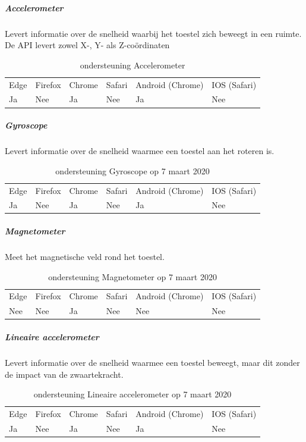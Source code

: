 	
	\subparagraph{Accelerometer  }
		Levert informatie over de snelheid waarbij het toestel zich beweegt in een ruimte. De API levert zowel X-, Y- als Z-coördinaten
		
		\begin{table}[H]
			\centering
			\begin{tabular}{llllll}
				Edge & Firefox & Chrome & Safari & Android (Chrome) & IOS (Safari) \\
				Ja   & Nee      &  Ja   & Nee     & Ja               & Nee          
			\end{tabular}	
			\caption{ondersteuning	Accelerometer   }
		\end{table}
		
		
		
	\subparagraph{Gyroscope  }
		Levert informatie over de snelheid waarmee een toestel aan het roteren is. 
			
		\begin{table}[H]
			\centering
			\begin{tabular}{llllll}
				Edge & Firefox & Chrome & Safari & Android (Chrome) & IOS (Safari) \\
				Ja   & Nee      &  Ja   & Nee     & Ja               & Nee          
			\end{tabular}	
			\caption{ondersteuning Gyroscope op 7 maart 2020 }
		\end{table}
			
	\subparagraph{Magnetometer }
			Meet het magnetische veld rond het toestel. 
			
		\begin{table}[H]
			\centering
			\begin{tabular}{llllll}
				Edge & Firefox & Chrome & Safari & Android (Chrome) & IOS (Safari) \\
				Nee   & Nee      &  Ja   & Nee     & Nee               & Nee          
			\end{tabular}	
			\caption{ondersteuning Magnetometer op 7 maart 2020 }
		\end{table}
			
			
	\subparagraph{Lineaire accelerometer}
		Levert informatie over de snelheid waarmee een toestel beweegt, maar dit zonder de impact van de zwaartekracht.
			
		\begin{table}[H]
			\centering
			\begin{tabular}{llllll}
				Edge & Firefox & Chrome & Safari & Android (Chrome) & IOS (Safari) \\
				Ja   & Nee      &  Ja   & Nee     & Ja               & Nee          
			\end{tabular}	
			\caption{ondersteuning Lineaire accelerometer  op 7 maart 2020 }
		\end{table}
		
